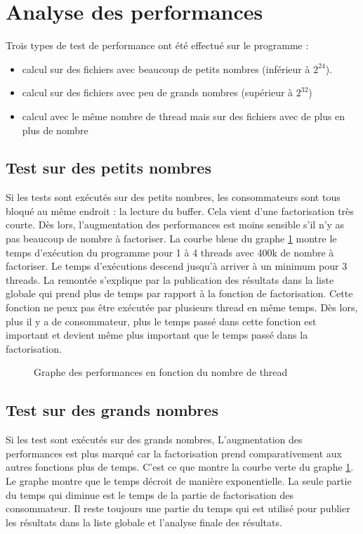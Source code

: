 \documentclass[12pt]{article}
\begin{document}
\section{Analyse des performances}

Trois types de test de performance ont été effectué sur le programme : 
\begin{itemize}
\item calcul sur des fichiers avec beaucoup de petits nombres (inférieur à  $2^{24}$).
\item calcul sur des fichiers avec peu de grands nombres (supérieur à $2^{32}$)
\item calcul avec le même nombre de thread mais sur des fichiers avec de plus en plus de nombre
\end{itemize}
\subsection{Test sur des petits nombres}
Si les tests sont exécutés sur des petits nombres, les consommateurs sont tous bloqué au même endroit : la lecture du buffer. Cela vient d'une factorisation très courte. Dès lors, l'augmentation des performances est moins sensible s'il n'y as pas beaucoup de nombre à factoriser. La courbe bleue du graphe \ref{graph1} montre le temps d'exécution du programme pour 1 à 4 threads avec 400k de nombre à factoriser. 
Le temps d'exécutions descend jusqu'à arriver à un minimum pour 3 threads. La remontée s'explique par la publication des résultats dans la liste globale qui prend plus de temps par rapport à la fonction de factorisation. Cette fonction ne peux pas être exécutée par plusieurs thread en même temps. Dès lors, plus il y a de consommateur, plus le temps passé dans cette fonction est important et devient même plus important que le temps passé dans la factorisation.
\begin{figure}[!h]
\centering
{}
\caption{\label{graph1}Graphe des performances en fonction du nombre de thread}
\end{figure}
\subsection{Test sur des grands nombres}
Si les test sont exécutés sur des grands nombres, L'augmentation des performances est plus marqué car la factorisation prend comparativement aux autres fonctions plus de temps. C'est ce que montre la courbe verte du graphe \ref{graph1}. Le graphe montre que le temps décroit de manière exponentielle. La seule partie du temps qui diminue est le temps de la partie de factorisation des consommateur. Il reste toujours une partie du temps qui est utilisé pour publier les résultats dans la liste globale et l'analyse finale des résultats.\newpage
\end{document}
